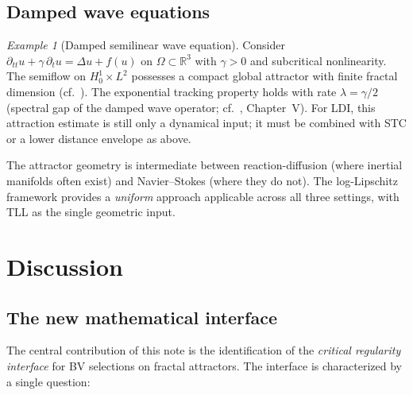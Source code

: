 \documentclass[12pt,a4paper]{article}
\theoremstyle{definition}
\theoremstyle{plain}
\theoremstyle{remark}
\newtheorem{example}[definition]{Example}
\begin{document}
\subsection{Damped wave equations}

\begin{example}[Damped semilinear wave equation]
\label{ex:wave}
Consider $\partial_{tt} u + \gamma\,\partial_t u = \Delta u + f(u)$
on $\Omega \subset \mathbb{R}^3$ with $\gamma > 0$ and subcritical
nonlinearity.  The semiflow on $H^1_0 \times L^2$ possesses a
compact global attractor with finite fractal dimension
(cf.~\cite{BabinVishik1992}).  The exponential tracking property
holds with rate $\lambda = \gamma/2$ (spectral gap of the damped
wave operator; cf.~\cite{BabinVishik1992}, Chapter~V).  For LDI,
this attraction estimate is still only a dynamical input; it must be
combined with STC or a lower distance envelope as above.

The attractor geometry is intermediate between reaction-diffusion
(where inertial manifolds often exist) and Navier--Stokes (where
they do not).  The log-Lipschitz framework provides a
\emph{uniform} approach applicable across all three settings,
with TLL as the single geometric input.
\end{example}


\section{Discussion}
\label{sec:discussion}

\subsection{The new mathematical interface}

The central contribution of this note is the identification of
the \emph{critical regularity interface} for BV selections on
fractal attractors.  The interface is characterized by a single
question:

\begin{center}
\end{center}
\end{document}
